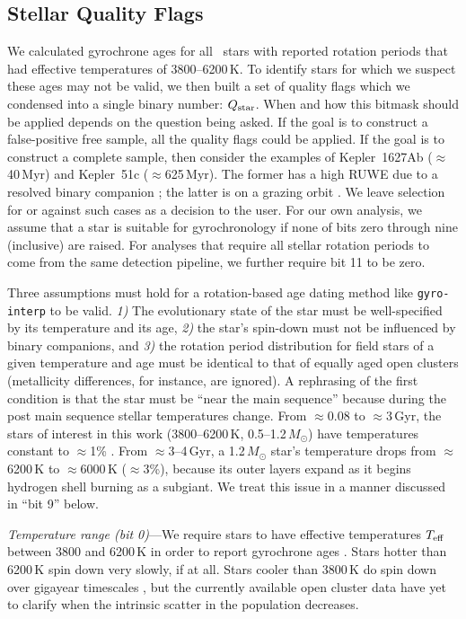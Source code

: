 \documentclass[11pt,twocolumn,tighten,linenumbers]{aastex63}
\begin{document}
\subsection{Stellar Quality Flags}
\label{subsec:flags}
We calculated gyrochrone ages for all \nuniqstarsantosrotteffcut\
stars with reported rotation periods that had effective temperatures
of 3800--6200\,K.  To identify stars for which we suspect these ages
may not be valid, we then built a set of quality flags which we
condensed into a single binary number: $Q_{\rm star}$.  When and how
this bitmask should be applied depends on the question being asked.
If the goal is to construct a false-positive free sample, all the
quality flags could be applied.  If the goal is to construct a
complete sample, then consider the examples of Kepler~1627Ab
($\approx$40\,Myr) and Kepler~51c ($\approx$625\,Myr).  The former has
a high RUWE due to a resolved binary companion \citep{Bouma_2022a};
the latter is on a grazing orbit \citep{2014ApJ...783...53M}.  We
leave selection for or against such cases as a decision to the user.
For our own analysis, we assume that a star is suitable for
gyrochronology if none of bits zero through nine (inclusive) are
raised.  For analyses that require all stellar rotation periods to
come from the same detection pipeline, we further require bit 11 to be
zero. 

Three assumptions must hold for a rotation-based age dating method
like \texttt{gyro-interp} to be valid.  {\it 1)} The evolutionary
state of the star must be well-specified by its temperature and its
age, {\it 2)} the star's spin-down must not be influenced by binary
companions, and {\it 3)} the rotation period distribution for field
stars of a given temperature and age must be identical to that of
equally aged open clusters (metallicity differences, for instance, are
ignored).  A rephrasing of the first condition is that the star must
be ``near the main sequence'' because during the post main sequence
stellar temperatures change.  From $\approx$0.08 to $\approx$3\,Gyr,
the stars of interest in this work (3800--6200\,K,
0.5--1.2\,$M_\odot$) have temperatures constant to $\approx$1\%
\citep{Choi_2016}.  From $\approx$3--4\,Gyr, a 1.2\,$M_\odot$ star's
temperature drops from $\approx$6200\,K to $\approx$6000\,K
($\approx$3\%), because its outer layers expand as it begins hydrogen
shell burning as a subgiant.  We treat this issue in a manner
discussed in ``bit 9'' below.

{\it Temperature range (bit 0)}---We require stars to have effective
temperatures $T_{\rm eff}$ between 3800 and 6200\,K in order to report
gyrochrone ages \citep{Bouma_2023}.   Stars hotter than 6200\,K spin
down very slowly, if at all.  Stars cooler than 3800\,K do spin down
over gigayear timescales
\citep{2016ApJ...821...93N,2023ApJ...954L..50E,2024arXiv240312129C},
but the currently available open cluster data have yet to clarify when
the intrinsic scatter in the population decreases.
\end{document}
